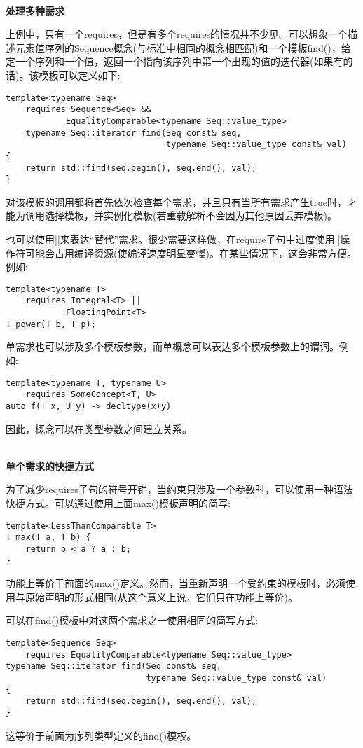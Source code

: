 \hspace*{\fill} \\ %
\noindent
\textbf{处理多种需求}

上例中，只有一个requires，但是有多个requires的情况并不少见。可以想象一个描述元素值序列的Sequence概念(与标准中相同的概念相匹配)和一个模板find()，给定一个序列和一个值，返回一个指向该序列中第一个出现的值的迭代器(如果有的话)。该模板可以定义如下:

\begin{lstlisting}[style=styleCXX]
template<typename Seq>
	requires Sequence<Seq> &&
			EqualityComparable<typename Seq::value_type>
	typename Seq::iterator find(Seq const& seq,
								typename Seq::value_type const& val)
{
	return std::find(seq.begin(), seq.end(), val);
}
\end{lstlisting}

对该模板的调用都将首先依次检查每个需求，并且只有当所有需求产生true时，才能为调用选择模板，并实例化模板(若重载解析不会因为其他原因丢弃模板)。

也可以使用||来表达“替代”需求。很少需要这样做，在require子句中过度使用||操作符可能会占用编译资源(使编译速度明显变慢)。在某些情况下，这会非常方便。例如:

\begin{lstlisting}[style=styleCXX]
template<typename T>
	requires Integral<T> ||
			FloatingPoint<T>
T power(T b, T p);
\end{lstlisting}

单需求也可以涉及多个模板参数，而单概念可以表达多个模板参数上的谓词。例如:

\begin{lstlisting}[style=styleCXX]
template<typename T, typename U>
	requires SomeConcept<T, U>
auto f(T x, U y) -> decltype(x+y)
\end{lstlisting}

因此，概念可以在类型参数之间建立关系。

\hspace*{\fill} \\ %
\noindent
\textbf{单个需求的快捷方式}

为了减少requires子句的符号开销，当约束只涉及一个参数时，可以使用一种语法快捷方式。可以通过使用上面max()模板声明的简写:

\begin{lstlisting}[style=styleCXX]
template<LessThanComparable T>
T max(T a, T b) {
	return b < a ? a : b;
}
\end{lstlisting}

功能上等价于前面的max()定义。然而，当重新声明一个受约束的模板时，必须使用与原始声明的形式相同(从这个意义上说，它们只在功能上等价)。

可以在find()模板中对这两个需求之一使用相同的简写方式:

\begin{lstlisting}[style=styleCXX]
template<Sequence Seq>
	requires EqualityComparable<typename Seq::value_type>
typename Seq::iterator find(Seq const& seq,
							typename Seq::value_type const& val)
{
	return std::find(seq.begin(), seq.end(), val);
}
\end{lstlisting}

这等价于前面为序列类型定义的find()模板。





